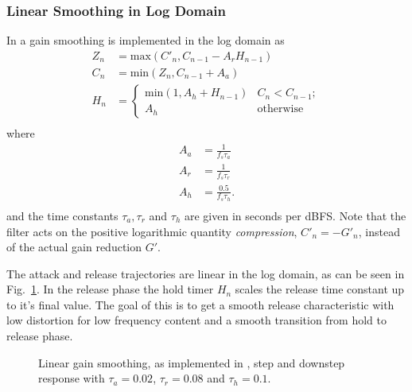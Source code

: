 \documentclass[../main2.tex]{subfiles}
\providecommand{\rootdir}{..}
\begin{document}
\subsubsection{Linear Smoothing in Log Domain}
In \cite{frindle1996implementation} a gain smoothing is implemented in the log domain as
\begin{equation}
\begin{split}
Z_n &= \text{max}(C'_n, C_{n-1} - A_r H_{n-1} )\\
C_n &= \text{min}(Z_n, C_{n-1} + A_a) \\
H_n &=
\begin{cases}
    \text{min}(1,A_h + H_{n-1})	& C_n < C_{n-1}; \\
    A_h					& \text{otherwise}
\end{cases} \\
\end{split}
\end{equation}
where
\begin{equation}
\begin{split}
A_a &= \frac{1}{f_s \tau_a} \\
A_r &= \frac{1}{f_s \tau_r} \\
A_h &= \frac{0.5}{f_s \tau_h}. \\
\end{split}
\end{equation}
and the time constants $\tau_a, \tau_r$ and $\tau_h$ are given in seconds per dBFS. Note that the filter acts on the positive logarithmic quantity \emph{compression}, $C'_n = -G'_n$, instead of the actual gain reduction $G'$.

The attack and release trajectories are linear in the log domain, as can be seen in Fig.~\ref{fig:step_frindle_gain}. In the release phase the hold timer $H_n$ scales the release time constant up to it's final value. The goal of this is to get a smooth release characteristic with low distortion for low frequency content and a smooth transition from hold to release phase.
\begin{figure}[h]
\centerline{}
\caption{Linear gain smoothing, as implemented in \cite{frindle1996implementation}, step and downstep response with $\tau_a=0.02$, $\tau_r=0.08$ and $\tau_h= 0.1$.}
\label{fig:step_frindle_gain}
\end{figure}
\end{document}
